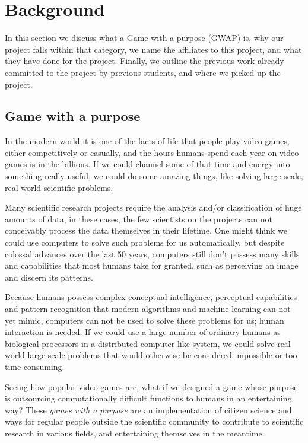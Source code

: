 \section{Background}\label{sec:background}
	In this section we discuss what a Game with a purpose (GWAP) \cite{gwap} is, why our project falls within that category, we name the affiliates to this project, and what they have done for the project. Finally, we outline the previous work already committed to the project by previous students, and where we picked up the project.

\subsection{Game with a purpose}
	In the modern world it is one of the facts of life that people play video games, either competitively or casually, and the hours humans spend each year on video games is in the billions. If we could channel some of that time and energy into something really useful, we could do some amazing things, like solving large scale, real world scientific problems.

	Many scientific research projects require the analysis and/or classification of huge amounts of data, in these cases, the few scientists on the projects can not conceivably process the data themselves in their lifetime. One might think we could use computers to solve such problems for us automatically, but despite colossal advances over the last 50 years, computers still don't possess many skills and capabilities that most humans take for granted, such as perceiving an image and discern its patterns.

	Because humans possess complex conceptual intelligence, perceptual capabilities and pattern recognition that modern algorithms and machine learning can not yet mimic, computers can not be used to solve these problems for us; human interaction is needed. If we could use a large number of ordinary humans as biological processors in a distributed computer-like system, we could solve real world large scale problems that would otherwise be considered impossible or too time consuming.

	Seeing how popular video games are, what if we designed a game whose purpose is outsourcing computationally difficult functions to humans in an entertaining way? These \emph{games with a purpose} are an implementation of citizen science and ways for regular people outside the scientific community to contribute to scientific research in various fields, and entertaining themselves in the meantime.

